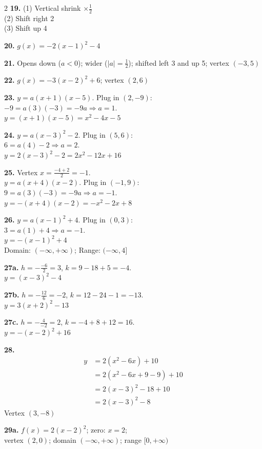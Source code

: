 \documentclass[11pt]{article}
\begin{document}
\begin{multicols}{2}
\medskip
\textbf{19.} (1) Vertical shrink $\times\tfrac{1}{2}$\\
(2) Shift right 2\\
(3) Shift up 4

\medskip
\textbf{20.} $g(x)=-2(x-1)^2-4$

\medskip
\textbf{21.} Opens down ($a<0$); wider ($|a|=\tfrac{1}{2}$); shifted left 3 and up 5; vertex $(-3,5)$

\medskip
\textbf{22.} $g(x)=-3(x-2)^2+6$; vertex $(2,6)$

\medskip
\textbf{23.} $y=a(x+1)(x-5)$. Plug in $(2,-9)$:\\
$-9=a(3)(-3)=-9a \Rightarrow a=1$.\\
$y=(x+1)(x-5)=x^2-4x-5$

\medskip
\textbf{24.} $y=a(x-3)^2-2$. Plug in $(5,6)$:\\
$6=a(4)-2 \Rightarrow a=2$.\\
$y=2(x-3)^2-2=2x^2-12x+16$

\medskip
\textbf{25.} Vertex $x=\frac{-4+2}{2}=-1$.\\
$y=a(x+4)(x-2)$. Plug in $(-1,9)$:\\
$9=a(3)(-3)=-9a \Rightarrow a=-1$.\\
$y=-(x+4)(x-2)=-x^2-2x+8$

\medskip
\textbf{26.} $y=a(x-1)^2+4$. Plug in $(0,3)$:\\
$3=a(1)+4 \Rightarrow a=-1$.\\
$y=-(x-1)^2+4$\\
Domain: $(-\infty,+\infty)$; Range: $(-\infty,4]$

\medskip
\textbf{27a.} $h=-\frac{-6}{2}=3$, $k=9-18+5=-4$.\\
$y=(x-3)^2-4$

\medskip
\textbf{27b.} $h=-\frac{12}{6}=-2$, $k=12-24-1=-13$.\\
$y=3(x+2)^2-13$

\medskip
\textbf{27c.} $h=-\frac{4}{-2}=2$, $k=-4+8+12=16$.\\
$y=-(x-2)^2+16$

\medskip
\textbf{28.}
\begin{align*}
y &= 2(x^2-6x)+10\\
  &= 2(x^2-6x+9-9)+10\\
  &= 2(x-3)^2-18+10\\
  &= 2(x-3)^2-8
\end{align*}
Vertex $(3,-8)$

\medskip
\textbf{29a.} $f(x)=2(x-2)^2$; zero: $x=2$;\\
vertex $(2,0)$; domain $(-\infty,+\infty)$; range $[0,+\infty)$


\end{multicols}
\end{document}
